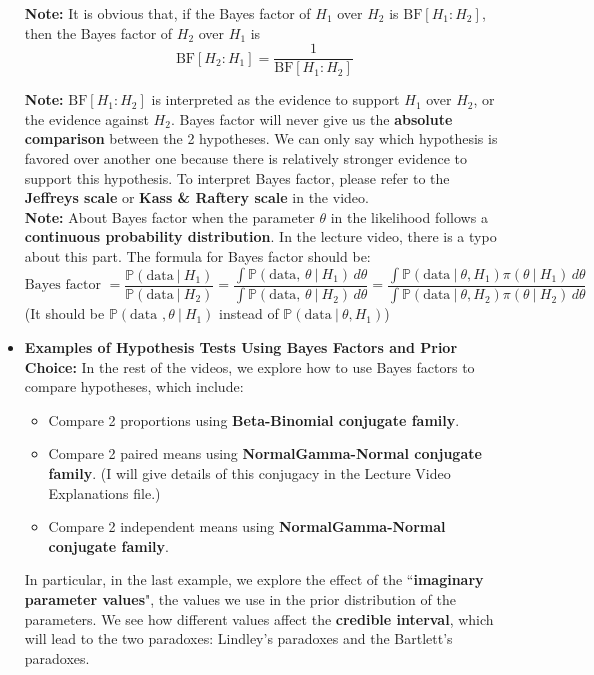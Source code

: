 \documentclass{article}
\def\dsst{\displaystyle}
\begin{document}
\begin{itemize}
	\textbf{Note:} It is obvious that, if the Bayes factor of $H_1$ over $H_2$ is $\text{BF}[H_1:H_2]$, then the Bayes factor of $H_2$ over $H_1$ is
	$$ \text{BF}[H_2:H_1] = \frac{1}{\text{BF}[H_1:H_2]} $$
	
	\textbf{Note:} $\text{BF}[H_1:H_2]$ is interpreted as the evidence to support $H_1$ over $H_2$, or the evidence against $H_2$. Bayes factor will never give us the \textbf{absolute comparison} between the 2 hypotheses. We can only say which hypothesis is favored over another one because there is relatively stronger evidence to support this hypothesis. To interpret Bayes factor, please refer to the \textbf{Jeffreys scale} or \textbf{Kass \& Raftery scale} in the video.\\

	
	\textbf{Note:} About Bayes factor when the parameter $\theta$ in the likelihood follows a \textbf{continuous probability distribution}. In the lecture video, there is a typo about this part. The formula for Bayes factor should be: 
	$$ \text{Bayes factor } = \frac{\dsst \mathbb{P}(\text{data}~|~H_1)}{\dsst \mathbb{P}(\text{data}~|~H_2)}  = \frac{\dsst \int \mathbb{P}(\text{data, }\theta~|~H_1)\, d\theta }{\dsst \int \mathbb{P}(\text{data, } \theta~|~H_2)\, d\theta}= \frac{\dsst \int \mathbb{P}(\text{data}~|~\theta, H_1)\pi(\theta~|~H_1)\, d\theta}{\dsst \int \mathbb{P}(\text{data}~|~\theta, H_2)\pi(\theta~|~H_2)\, d\theta} $$
	(It should be $\mathbb{P}(\text{data },\theta~|~H_1)$ instead of $\mathbb{P}(\text{data}~|~\theta, H_1)$)
	
	\item \textbf{Examples of Hypothesis Tests Using Bayes Factors and Prior Choice:} In the rest of the videos, we explore how to use Bayes factors to compare hypotheses, which include:
	\begin{itemize}
		\item Compare 2 proportions using \textbf{Beta-Binomial conjugate family}.
		
		\item Compare 2 paired means using \textbf{NormalGamma-Normal conjugate family}. (I will give details of this conjugacy in the Lecture Video Explanations file.)
		
		\item Compare 2 independent means using \textbf{NormalGamma-Normal conjugate family}. 
	\end{itemize}
	
	In particular, in the last example, we explore the effect of the ``\textbf{imaginary parameter values}", the values we use in the prior distribution of the parameters. We see how different values affect the \textbf{credible interval}, which will lead to the two paradoxes: Lindley's paradoxes and the Bartlett's paradoxes. \\
	

\end{itemize}
\end{document}
